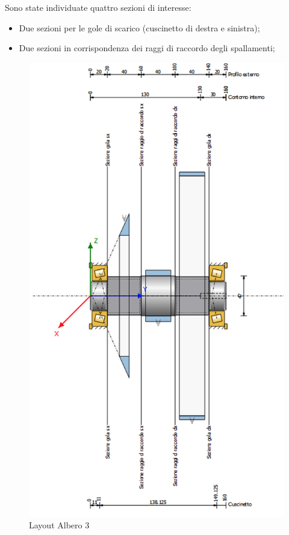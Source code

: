 Sono state individuate quattro sezioni di interesse:
\begin{itemize}
    \item Due sezioni per le gole di scarico (cuscinetto di destra e sinistra);
    \item Due sezioni in corrispondenza dei raggi di raccordo degli spallamenti;
\end{itemize}
\newpage
\begin{figure}[h]
    \centering
    \includegraphics[scale=0.52]{Immagini/Albero3.png}
    \caption{Layout Albero 3}
    \label{fig:Albero3}
\end{figure}
\newpage

